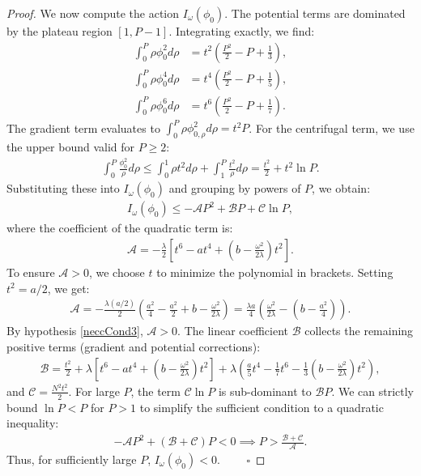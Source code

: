 \documentclass[10pt,a4paper]{amsart}
\begin{document}
\begin{proof}
		We now compute the action $I_{\omega}(\phi_0)$. The potential terms are dominated by the plateau region $[1, P-1]$. Integrating exactly, we find:
		\begin{align}
			\int_0^P \rho \phi_0^2 d\rho &= t^2\left(\frac{P^2}{2} - P + \frac{1}{3}\right), \\
			\int_0^P \rho \phi_0^4 d\rho &= t^4\left(\frac{P^2}{2} - P + \frac{1}{5}\right), \\
			\int_0^P \rho \phi_0^6 d\rho &= t^6\left(\frac{P^2}{2} - P + \frac{1}{7}\right).
		\end{align}
		The gradient term evaluates to $\int_0^P \rho \phi_{0,\rho}^2 d\rho = t^2 P$. For the centrifugal term, we use the upper bound valid for $P \ge 2$:
		\begin{align}
			\int_0^P \frac{\phi_0^2}{\rho} d\rho \le \int_0^1 \rho t^2 d\rho + \int_1^P \frac{t^2}{\rho} d\rho = \frac{t^2}{2} + t^2 \ln P.
		\end{align}
		Substituting these into $I_{\omega}(\phi_0)$ and grouping by powers of $P$, we obtain:
		\begin{align}
			I_{\omega}(\phi_0) \le -\mathcal{A} P^2 + \mathcal{B} P + \mathcal{C} \ln P,
		\end{align}
		where the coefficient of the quadratic term is:
		\begin{align}
			\mathcal{A} = -\frac{\lambda}{2} \left[ t^6 - a t^4 + \left(b - \frac{\omega^2}{2\lambda}\right)t^2 \right].
		\end{align}
		To ensure $\mathcal{A} > 0$, we choose $t$ to minimize the polynomial in brackets. Setting $t^2 = a/2$, we get:
		\begin{align}
			\mathcal{A} = -\frac{\lambda (a/2)}{2} \left( \frac{a^2}{4} - \frac{a^2}{2} + b - \frac{\omega^2}{2\lambda} \right) = \frac{\lambda a}{4} \left( \frac{\omega^2}{2\lambda} - \left(b - \frac{a^2}{4}\right) \right).
		\end{align}
		By hypothesis \eqref{neccCond3}, $\mathcal{A} > 0$. The linear coefficient $\mathcal{B}$ collects the remaining positive terms (gradient and potential corrections):
		\begin{align}
			\mathcal{B} = \frac{t^2}{2} + \lambda \left[ t^6 - at^4 + \left(b - \frac{\omega^2}{2\lambda}\right)t^2 \right] + \lambda \left( \frac{a}{5}t^4 - \frac{1}{7}t^6 - \frac{1}{3}\left(b - \frac{\omega^2}{2\lambda}\right)t^2 \right),
		\end{align}
		and $\mathcal{C} = \frac{N^2 t^2}{2}$. For large $P$, the term $\mathcal{C} \ln P$ is sub-dominant to $\mathcal{B} P$. We can strictly bound $\ln P < P$ for $P>1$ to simplify the sufficient condition to a quadratic inequality:
		\begin{align}
			-\mathcal{A} P^2 + (\mathcal{B} + \mathcal{C}) P < 0 \implies P > \frac{\mathcal{B} + \mathcal{C}}{\mathcal{A}}.
		\end{align}
		Thus, for sufficiently large $P$, $I_{\omega}(\phi_0) < 0$.
		$\qquad\square$
	\end{proof}
\end{document}
